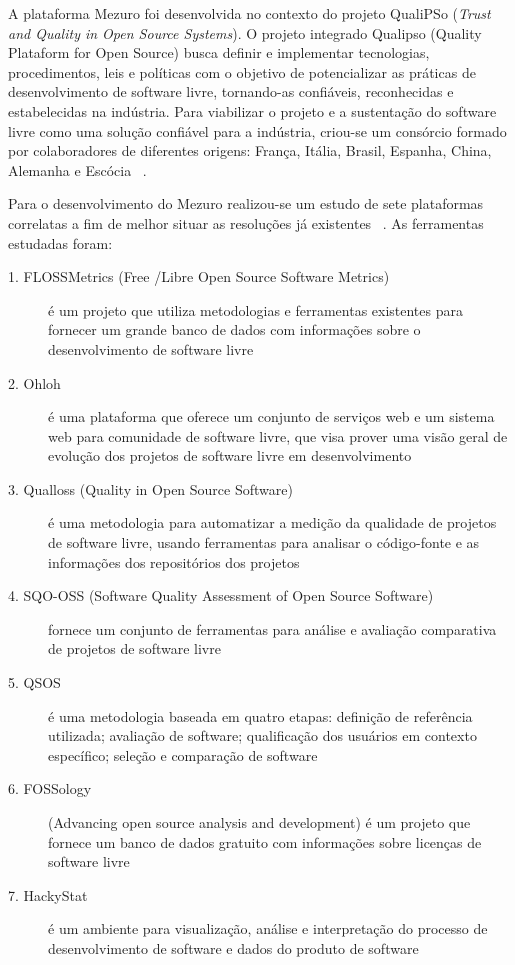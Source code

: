 A plataforma Mezuro foi desenvolvida no contexto do projeto QualiPSo (\textit{Trust and Quality in Open Source Systems}).
O projeto integrado Qualipso (Quality Plataform for Open Source) busca definir e implementar tecnologias, procedimentos, leis e políticas com o objetivo de potencializar as práticas de desenvolvimento de software livre, tornando-as confiáveis, reconhecidas e estabelecidas na indústria.
Para viabilizar o projeto e a sustentação do software livre como uma solução confiável para a indústria, criou-se um consórcio formado por colaboradores de diferentes origens: França, Itália, Brasil, Espanha, China, Alemanha e Escócia~\cite{qualipso2013}
.

Para o desenvolvimento do Mezuro realizou-se um estudo de sete plataformas correlatas a fim de melhor situar as resoluções já existentes~\cite{meirelles2013}%
. As ferramentas estudadas foram:

\begin{description}
\item[1. FLOSSMetrics (Free /Libre Open Source Software Metrics)]
é um projeto que utiliza metodologias e ferramentas existentes para fornecer um grande banco de dados com informações sobre o desenvolvimento de software livre
\item[2. Ohloh]
é uma plataforma que oferece um conjunto de serviços web e um sistema web para comunidade de software livre, que visa prover uma visão geral de evolução dos projetos de software livre em desenvolvimento
\item[3. Qualloss (Quality in Open Source Software)]
é uma metodologia para automatizar a medição da qualidade de projetos de software livre, usando ferramentas para analisar o código-fonte e as informações dos repositórios dos projetos
\item[4. SQO-OSS (Software Quality Assessment of Open Source Software)]
fornece um conjunto de ferramentas para análise e avaliação comparativa de projetos de software livre
\item[5. QSOS]
é uma metodologia baseada em quatro etapas: definição de referência utilizada; avaliação de software; qualificação dos usuários em contexto específico; seleção e comparação de software
\item[6. FOSSology]
(Advancing open source analysis and development) é um projeto que fornece um banco de dados gratuito com informações sobre licenças de software livre
\item[7. HackyStat]
é um ambiente para visualização, análise e interpretação do processo de desenvolvimento de software e dados do produto de software
\end{description}

